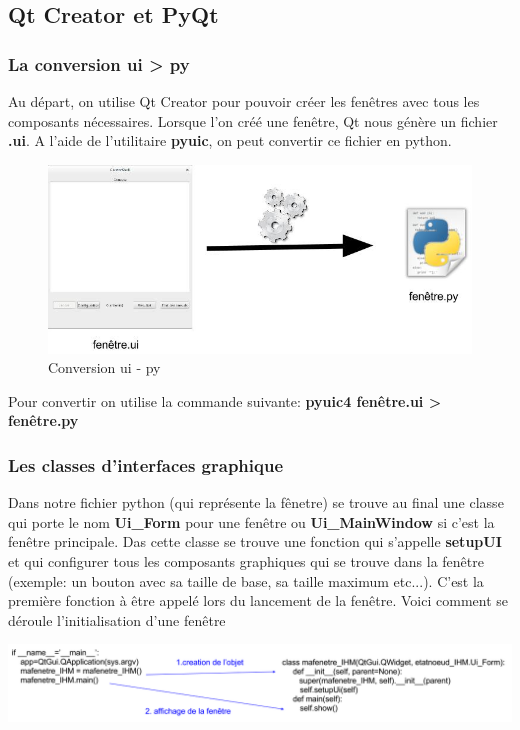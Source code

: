 \documentclass[a4paper,11pt]{article}
\begin{document}
\subsection{Qt Creator et PyQt}
\subsubsection{La conversion ui > py}
Au départ, on utilise Qt Creator pour pouvoir créer les fenêtres avec tous les composants nécessaires. Lorsque l'on créé une fenêtre, Qt nous génère un fichier \textbf{.ui}. A l'aide de l'utilitaire \textbf{pyuic}, on peut convertir ce fichier en python.
\begin{figure}[hbtp]
\centering
\includegraphics[scale=0.3]{conversion_ui_py.jpg}
\caption{Conversion ui - py}
\end{figure}
Pour convertir on utilise la commande suivante: \textbf{pyuic4 fenêtre.ui > fenêtre.py}\linebreak
\\
\subsubsection{Les classes d'interfaces graphique}
Dans notre fichier python (qui représente la fênetre) se trouve au final une classe qui porte le nom \textbf{Ui\_Form} pour une fenêtre ou \textbf{Ui\_MainWindow} si c'est la fenêtre principale. Das cette classe se trouve une fonction qui s'appelle \textbf{setupUI} et qui configurer tous les composants graphiques qui se trouve dans la fenêtre (exemple: un bouton avec sa taille de base, sa taille maximum etc...). C'est la première fonction à être appelé lors du lancement de la fenêtre.
\linebreak
Voici comment se déroule l'initialisation d'une fenêtre
\begin{center}
\includegraphics[scale=0.45]{initialisation_fenetre.jpg} 
\end{center}
\end{document}
